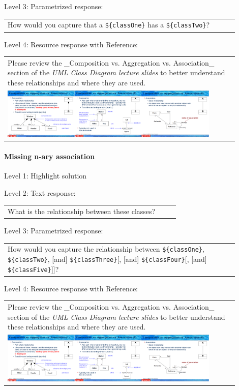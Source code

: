 \noindent Level 3: Parametrized response: \medskip

\begin{tabular}{|p{0.9\linewidth}}
How would you capture that a \verb|${classOne}| has a \verb|${classTwo}|?
\end{tabular} \medskip

\noindent Level 4: Resource response with Reference: \medskip

\begin{tabular}{|p{0.9\linewidth}}
Please review the _Composition vs. Aggregation vs. Association_ section of 
the \textit{UML Class Diagram lecture slides} to 
better understand these relationships and where they are used.

\\
\includegraphics[width=0.9\textwidth]{images/composition_aggregation_association.png}
\end{tabular} \medskip


\paragraph{Missing n-ary association}

\noindent Level 1: Highlight solution \medskip

\noindent Level 2: Text response: \medskip

\begin{tabular}{|p{0.9\linewidth}}
What is the relationship between these classes?
\end{tabular} \medskip

\noindent Level 3: Parametrized response: \medskip

\begin{tabular}{|p{0.9\linewidth}}
How would you capture the relationship between \verb|${classOne}|, \verb|${classTwo}|, [and] \verb|${classThree}|[, [and] \verb|${classFour}|[, [and] \verb|${classFive}|]]?
\end{tabular} \medskip

\noindent Level 4: Resource response with Reference: \medskip

\begin{tabular}{|p{0.9\linewidth}}
Please review the _Composition vs. Aggregation vs. Association_ section of 
the \textit{UML Class Diagram lecture slides} to 
better understand these relationships and where they are used.

\\
\includegraphics[width=0.9\textwidth]{images/composition_aggregation_association.png}
\end{tabular} \medskip


